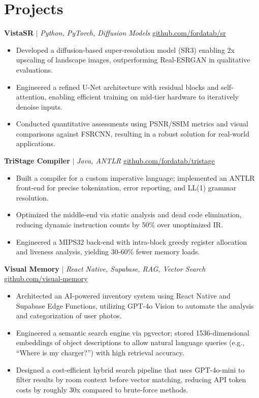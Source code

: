 \documentclass[11pt]{article}
\begin{document}
\section*{Projects}

\textbf{VistaSR} $|$ \emph{Python, PyTorch, Diffusion Models} \hfill \href{https://github.com/fordatab/sr}{github.com/fordatab/sr}
\vspace{-2pt}
\begin{itemize}
    \item Developed a diffusion-based super-resolution model (SR3) enabling 2x upscaling of landscape images, outperforming Real-ESRGAN in qualitative evaluations.
    \item Engineered a refined U-Net architecture with residual blocks and self-attention, enabling efficient training on mid-tier hardware to iteratively denoise inputs.
    \item Conducted quantitative assessments using PSNR/SSIM metrics and visual comparisons against FSRCNN, resulting in a robust solution for real-world applications.
\end{itemize}
\vspace{4pt} 

\textbf{TriStage Compiler} $|$ \emph{Java, ANTLR} \hfill \href{https://github.com/fordatab/tristage}{github.com/fordatab/tristage}
\vspace{-2pt}
\begin{itemize}
    \item Built a compiler for a custom imperative language; implemented an ANTLR front-end for precise tokenization, error reporting, and LL(1) grammar resolution.
    \item Optimized the middle-end via static analysis and dead code elimination, reducing dynamic instruction counts by 50\% over unoptimized IR.
    \item Engineered a MIPS32 back-end with intra-block greedy register allocation and liveness analysis, yielding 30-60\% fewer memory loads.
\end{itemize}
\vspace{4pt} 

\textbf{Visual Memory} $|$ \emph{React Native, Supabase, RAG, Vector Search} \hfill \href{https://github.com/fordatab/vis}{github.com/visual-memory}
\vspace{-2pt}
\begin{itemize}
    \item Architected an AI-powered inventory system using React Native and Supabase Edge Functions, utilizing GPT-4o Vision to automate the analysis and categorization of user photos.
    \item Engineered a semantic search engine via pgvector; stored 1536-dimensional embeddings of object descriptions to allow natural language queries (e.g., ``Where is my charger?'') with high retrieval accuracy.
    \item Designed a cost-efficient hybrid search pipeline that uses GPT-4o-mini to filter results by room context before vector matching, reducing API token costs by roughly 30x compared to brute-force methods.
\end{itemize}
\vspace{-12pt}
\end{document}
